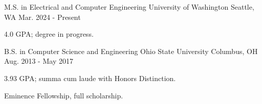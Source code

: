 

\begin{cventries}

  \cventry
    {M.S. in Electrical and Computer Engineering} %
    {University of Washington} %
    {Seattle, WA} %
    {Mar. 2024 - Present} %
    {
      \begin{cvitems}
        \item {4.0 GPA; degree in progress.}
      \end{cvitems}
    }

  \cventry
    {B.S. in Computer Science and Engineering} %
    {Ohio State University} %
    {Columbus, OH} %
    {Aug. 2013 - May 2017} %
    {
      \begin{cvitems} %
        \item {3.93 GPA; summa cum laude with Honors Distinction.}
        \item {Eminence Fellowship, full scholarship.}
      \end{cvitems}
    }

\end{cventries}
